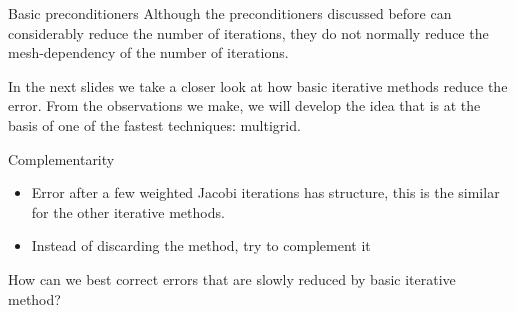 \begin{frame}{Basic preconditioners}
  Although the preconditioners discussed before can considerably
reduce the number of iterations, they do not normally reduce the
mesh-dependency of the number of iterations.

In the next slides we take a closer look at how basic iterative
methods reduce the error. From the observations we make, we
will develop the idea that is at the basis of one of the fastest
techniques: multigrid.
\end{frame}





\begin{frame}{Complementarity}
  \begin{itemize}
  \item  Error after a few weighted Jacobi iterations has structure,
this is the similar for the other  iterative methods.
\item Instead of discarding the method, try to complement it

  \end{itemize}
How can we best correct errors that are slowly reduced by basic
iterative method?
\end{frame}


